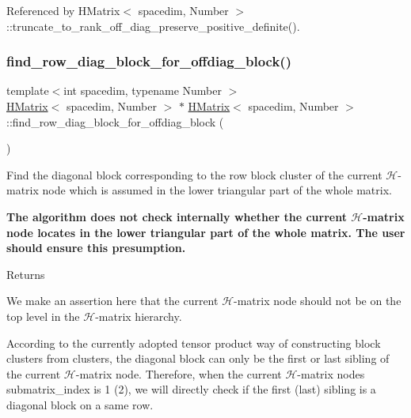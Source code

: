 Referenced by H\+Matrix$<$ spacedim, Number $>$\+::truncate\+\_\+to\+\_\+rank\+\_\+off\+\_\+diag\+\_\+preserve\+\_\+positive\+\_\+definite().

\mbox{\label{classHMatrix_a1da518d5ca7e685e3e787f58dcad4e61}} 
\subsubsection{\texorpdfstring{find\+\_\+row\+\_\+diag\+\_\+block\+\_\+for\+\_\+offdiag\+\_\+block()}{find\_row\_diag\_block\_for\_offdiag\_block()}}
{\footnotesize\ttfamily template$<$int spacedim, typename Number $>$ \\
\hyperlink{classHMatrix}{H\+Matrix}$<$ spacedim, Number $>$ $\ast$ \hyperlink{classHMatrix}{H\+Matrix}$<$ spacedim, Number $>$\+::find\+\_\+row\+\_\+diag\+\_\+block\+\_\+for\+\_\+offdiag\+\_\+block (\begin{DoxyParamCaption}{ }\end{DoxyParamCaption})}

Find the diagonal block corresponding to the row block cluster of the current $\mathcal{H}$-\/matrix node which is assumed in the lower triangular part of the whole matrix.

{\bfseries The algorithm does not check internally whether the current $\mathcal{H}$-\/matrix node locates in the lower triangular part of the whole matrix. The user should ensure this presumption.}

\begin{DoxyReturn}{Returns}

\end{DoxyReturn}
We make an assertion here that the current $\mathcal{H}$-\/matrix node should not be on the top level in the $\mathcal{H}$-\/matrix hierarchy.

According to the currently adopted tensor product way of constructing block clusters from clusters, the diagonal block can only be the first or last sibling of the current $\mathcal{H}$-\/matrix node. Therefore, when the current $\mathcal{H}$-\/matrix node\textquotesingle{}s {\ttfamily submatrix\+\_\+index} is 1 (2), we will directly check if the first (last) sibling is a diagonal block on a same row.

